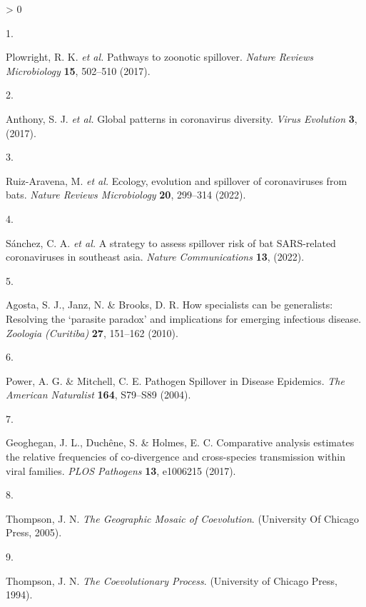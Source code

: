 \documentclass[10pt,oneside]{article}
\newlength{\cslhangindent}
\newlength{\csllabelwidth}
\newenvironment{CSLReferences}[3] %
 {%
  \setlength{\parindent}{0pt}
  \ifodd #1 \everypar{\setlength{\hangindent}{\cslhangindent}}\ignorespaces\fi
  \ifnum #2 > 0
  \setlength{\parskip}{#2\baselineskip}
  \fi
 }%
 {}
\newcommand{\CSLLeftMargin}[1]{\parbox[t]{\maxof{\widthof{#1}}{\csllabelwidth}}{#1}}
\newcommand{\CSLRightInline}[1]{\parbox[t]{\linewidth}{#1}}
\begin{document}
\hypertarget{refs}{}
\begin{CSLReferences}{0}{0}
\leavevmode\hypertarget{ref-Plowright2017Pathways}{}%
\CSLLeftMargin{1. }
\CSLRightInline{Plowright, R. K. \emph{et al.} Pathways to zoonotic
spillover. \emph{Nature Reviews Microbiology} \textbf{15}, 502--510
(2017).}

\leavevmode\hypertarget{ref-Anthony2017Global}{}%
\CSLLeftMargin{2. }
\CSLRightInline{Anthony, S. J. \emph{et al.} Global patterns in
coronavirus diversity. \emph{Virus Evolution} \textbf{3}, (2017).}

\leavevmode\hypertarget{ref-Ruiz-Aravena2022Ecology}{}%
\CSLLeftMargin{3. }
\CSLRightInline{Ruiz-Aravena, M. \emph{et al.} Ecology, evolution and
spillover of coronaviruses from bats. \emph{Nature Reviews Microbiology}
\textbf{20}, 299--314 (2022).}

\leavevmode\hypertarget{ref-Sanchez2022Strategy}{}%
\CSLLeftMargin{4. }
\CSLRightInline{Sánchez, C. A. \emph{et al.} A strategy to assess
spillover risk of bat SARS-related coronaviruses in southeast asia.
\emph{Nature Communications} \textbf{13}, (2022).}

\leavevmode\hypertarget{ref-Agosta2010How}{}%
\CSLLeftMargin{5. }
\CSLRightInline{Agosta, S. J., Janz, N. \& Brooks, D. R. How specialists
can be generalists: Resolving the {`parasite paradox'} and implications
for emerging infectious disease. \emph{Zoologia (Curitiba)} \textbf{27},
151--162 (2010).}

\leavevmode\hypertarget{ref-Power2004Pathogen}{}%
\CSLLeftMargin{6. }
\CSLRightInline{Power, A. G. \& Mitchell, C. E. Pathogen Spillover in
Disease Epidemics. \emph{The American Naturalist} \textbf{164}, S79--S89
(2004).}

\leavevmode\hypertarget{ref-Geoghegan2017Comparative}{}%
\CSLLeftMargin{7. }
\CSLRightInline{Geoghegan, J. L., Duchêne, S. \& Holmes, E. C.
Comparative analysis estimates the relative frequencies of co-divergence
and cross-species transmission within viral families. \emph{PLOS
Pathogens} \textbf{13}, e1006215 (2017).}

\leavevmode\hypertarget{ref-Thompson2005Geographic}{}%
\CSLLeftMargin{8. }
\CSLRightInline{Thompson, J. N. \emph{The Geographic Mosaic of
Coevolution}. (University Of Chicago Press, 2005).}

\leavevmode\hypertarget{ref-Thompson1994Coevolutionary}{}%
\CSLLeftMargin{9. }
\CSLRightInline{Thompson, J. N. \emph{The Coevolutionary Process}.
(University of Chicago Press, 1994).}


\end{CSLReferences}
\end{document}
